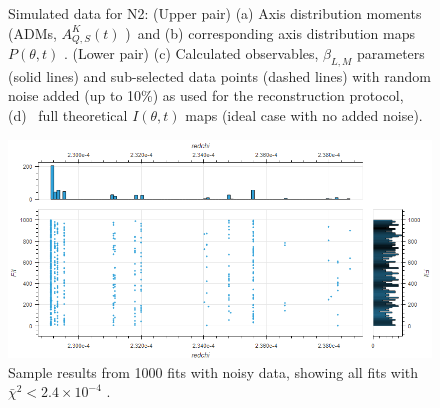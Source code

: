 \documentclass[10pt]{article}
\begin{document}
\begin{figure}[]
\begin{center}
\caption{Simulated data for N2: (Upper pair) (a) Axis distribution moments (ADMs, \(A^{K}_{Q,S}(t)\) ) and (b) corresponding axis distribution maps \(P(\theta, t)\) . (Lower pair) (c) Calculated observables, \(\beta_{L,M}\) parameters (solid lines) and sub-selected data points (dashed lines) with random noise added (up to 10\%) as used for the reconstruction protocol, (d)  full theoretical \(I(\theta,t)\) maps (ideal case with no added noise).\label{720080}}
\end{center}
\end{figure}



\begin{figure}[]
\begin{center}
\includegraphics[width=\textwidth,height=\dimexpr\textheight-4\baselineskip-\abovecaptionskip-\belowcaptionskip\relax,keepaspectratio]{figures/dataDump_1000fitTests_multiFit_noise_051021_fitHistPlot_290722_11-26-28.png}
\caption{Sample results from 1000 fits with noisy data, showing all fits with \(\bar{\chi}^2 < 2.4\times10^{-4}\) .\label{509194}}
\end{center}
\end{figure}
\end{document}
